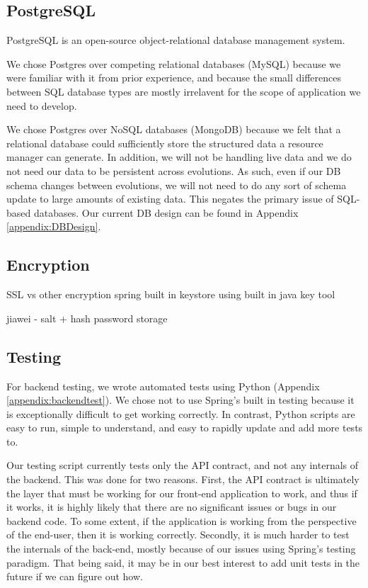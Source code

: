 \documentclass[12pt]{article}
\begin{document}
\subsection{PostgreSQL}
PostgreSQL is an open-source object-relational database management system. 

We chose Postgres over competing relational databases (MySQL) because we were familiar with it from prior experience, and because the small differences between SQL database types are mostly irrelavent for the scope of application we need to develop. 

We chose Postgres over NoSQL databases (MongoDB) because we felt that a relational database could sufficiently store the structured data a resource manager can generate. In addition, we will not be handling live data and we do not need our data to be persistent across evolutions. As such, even if our DB schema changes between evolutions, we will not need to do any sort of schema update to large amounts of existing data. This negates the primary issue of SQL-based databases. Our current DB design can be found in Appendix \ref{appendix:DBDesign}.


\subsection{Encryption}
SSL vs other encryption
spring built in 
keystore using built in java key tool 

jiawei - salt + hash password storage

\subsection{Testing}
For backend testing, we wrote automated tests using Python (Appendix \ref{appendix:backendtest}). We chose not to use Spring's built in testing because it is exceptionally difficult to get working correctly. In contrast, Python scripts are easy to run, simple to understand, and easy to rapidly update and add more tests to. 

Our testing script currently tests only the API contract, and not any internals of the backend. This was done for two reasons. First, the API contract is ultimately the layer that must be working for our front-end application to work, and thus if it works, it is highly likely that there are no significant issues or bugs in our backend code. To some extent, if the application is working from the perspective of the end-user, then it is working correctly. Secondly, it is much harder to test the internals of the back-end, mostly because of our issues using Spring's testing paradigm. That being said, it may be in our best interest to add unit tests in the future if we can figure out how. 
\end{document}
